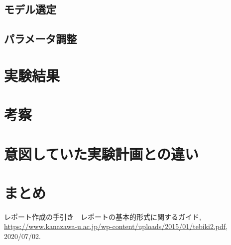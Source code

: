 \documentclass[a4paper, 11pt, titlepage]{jsarticle}
\begin{document}
\subsection{モデル選定}


\subsection{パラメータ調整}


\section{実験結果}


\section{考察}


\section{意図していた実験計画との違い}


\section{まとめ}


\begin{thebibliography}{n}
  レポート作成の手引き　レポートの基本的形式に関するガイド, \url{https://www.kanazawa-u.ac.jp/wp-content/uploads/2015/01/tebiki2.pdf}, 2020/07/02.

\end{thebibliography}
\end{document}
